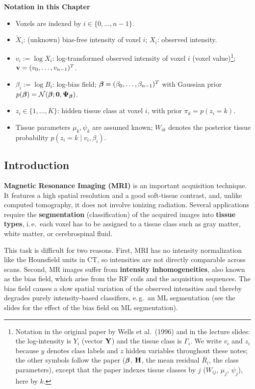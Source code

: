 \textbf{Notation in this Chapter}\\
{\small
\begin{itemize}
  \item Voxels are indexed by $i\in\{0,\dots,n-1\}$.
  \item $\tilde X_i$: (unknown) bias-free intensity of voxel $i$; $X_i$: observed intensity.
  \item $v_i:=\log X_i$: log-transformed observed intensity of voxel $i$ (voxel value)\footnote{Notation in the original paper by Wells et al.\ (1996) and in the lecture slides: the log-intensity is $Y_i$ (vector $\bm{\mathrm{Y}}$) and the tissue class is $\Gamma_i$. We write $v_i$ and $z_i$ because $y$ denotes class labels and $z$ hidden variables throughout these notes; the other symbols follow the paper ($\bm{\mathrm{\beta}}$, $\mathbf{H}$, the mean residual $\overline{R}_i$, the class parameters), except that the paper indexes tissue classes by $j$ ($W_{ij}$, $\mu_j$, $\psi_j$), here by $k$.}; $\bm{\mathrm{v}}=(v_0,\dots,v_{n-1})^T$.
  \item $\beta_i:=\log B_i$: log-bias field; $\bm{\mathrm{\beta}}=(\beta_0,\dots,\beta_{n-1})^T$ with Gaussian prior $p(\bm{\mathrm{\beta}})=\mathcal N(\bm{\mathrm{\beta}};\bm{\mathrm{0}},\mathbf{\Psi}_{\bm{\mathrm{\beta}}})$.
  \item $z_i\in\{1,\dots,K\}$: hidden tissue class at voxel $i$, with prior $\pi_k=p(z_i=k)$.
  \item Tissue parameters $\mu_k,\psi_k$ are assumed known; $W_{ik}$ denotes the posterior tissue probability $p(z_i=k\mid v_i,\beta_i)$.
\end{itemize}
}

\subsection{Introduction}
 \textbf{Magnetic Resonance Imaging (MRI)} is an important acquisition technique. It features a high spatial resolution and a good soft-tissue contrast, and, unlike computed tomography, it does not involve ionizing radiation. Several applications require the \textbf{segmentation} (classification) of the acquired images into \textbf{tissue types}, i.\,e.\ each voxel has to be assigned to a tissue class such as gray matter, white matter, or cerebrospinal fluid.

  This task is difficult for two reasons. First, MRI has no intensity normalization like the Hounsfield units in CT, so intensities are not directly comparable across scans. Second, MR images suffer from \textbf{intensity inhomogeneities}, also known as the bias field, which arise from the RF coils and the acquisition sequences. The bias field causes a slow spatial variation of the observed intensities and thereby degrades purely intensity-based classifiers, e.\,g.\ an ML segmentation (see the slides for the effect of the bias field on ML segmentation).

